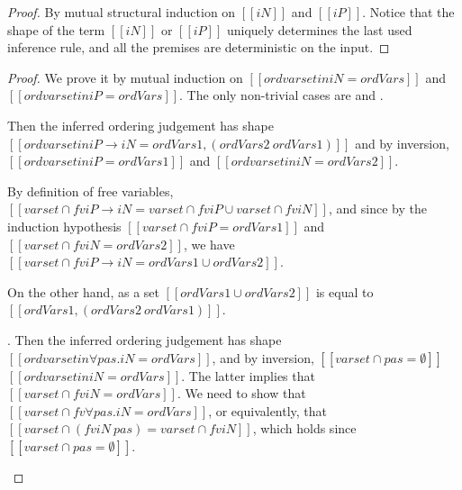 \obsOrdDeterministic*
\begin{proof}
  By mutual structural induction on $[[iN]]$ and $[[iP]]$.
  Notice that the shape of the term $[[iN]]$ or $[[iP]]$
  uniquely determines the last used inference rule,
  and all the premises are deterministic on the input.
\end{proof}

\lemOrdSoundness*
\begin{proof}
  We prove it by mutual induction on 
  $[[ ord varset in iN = ordVars ]]$ and $[[ ord varset in iP = ordVars ]]$.
  The only non-trivial cases are 
   and 
  .  
  \begin{caseof}
    \item {}  
      Then the inferred ordering judgement has shape
      $[[ord varset in iP → iN = ordVars1, (ordVars2 \ {ordVars1})]]$
      and by inversion, 
      $[[ord varset in iP = ordVars1]]$   
      and 
      $[[ord varset in iN = ordVars2]]$.

      By definition of free variables, 
      $[[varset ∩ fv iP → iN = varset ∩ fv iP ∪ varset ∩ fv iN]]$,
      and since by the induction hypothesis 
      $[[varset ∩ fv iP = {ordVars1}]]$ and
      $[[varset ∩ fv iN = {ordVars2}]]$,
      we have
      $[[varset ∩ fv iP → iN = {ordVars1} ∪ {ordVars2}]]$.

      On the other hand, 
      as a set $[[{ordVars1} ∪ {ordVars2}]]$
      is equal to $[[ordVars1, (ordVars2 \ {ordVars1})]]$. 
    \item  {}.
      Then  the inferred ordering judgement has shape
      $[[ord varset in ∀pas.iN = ordVars]]$,
      and by inversion, 
      $[[varset ∩ {pas} = ∅]]$    
      $[[ord varset in iN = ordVars]]$.
      The latter implies that $[[varset ∩ fv iN = {ordVars}]]$.
      We need to show that $[[varset ∩ fv ∀pas.iN = {ordVars}]]$,
      or equivalently, that
      $[[varset ∩ (fv iN \ {pas}) = varset ∩ fv iN ]]$,
      which holds since $[[varset ∩ {pas} = ∅]]$.
  \end{caseof}
\end{proof}


\corOrdAdditivity*

